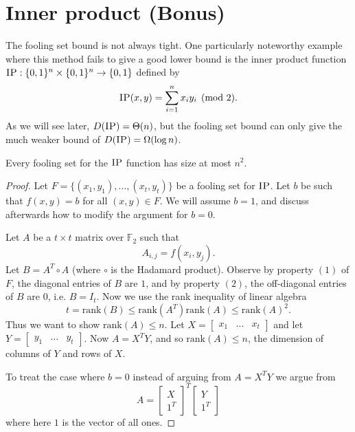 \newpage \section{Inner product (Bonus)}

The fooling set bound is not always tight. One particularly noteworthy example where this method fails to give a good lower bound is the inner product function  $\textsc{IP} : \{0,1\}^n \times \{0,1\}^n \to \{0,1\}$ defined by
\[
\textsc{IP}(x,y) = \sum_{i=1}^n x_i y_i \pmod{2}.
\]
As we will see later, $D(\textsc{IP}) = \Theta(n)$, but the fooling set bound can only give the much weaker bound of $D(\textsc{IP}) = \Omega(\log n)$.

\begin{theorem}
Every fooling set for the $\textsc{IP}$ function has size at most $n^2$.
\end{theorem}

\begin{proof}
Let $F = \{(x_1,y_1),\dots, (x_t,y_t)\}$ be a fooling set for $\textsc{IP}$. Let $b$ be such that $f(x,y) = b$ for all $(x,y) \in F$. We will assume $b=1$, and discuss afterwards how to modify the argument for $b=0$.

Let $A$ be a $t\times t$ matrix over $\mathbb{F}_2$ such that
$$A_{i,j} = f(x_i,y_j).$$
Let $B = A^T\circ A$ (where $\circ$ is the Hadamard product). Observe by property $(1)$ of $F$, the diagonal entries of $B$ are $1$, and by property $(2)$, the off-diagonal entries of $B$ are $0$, i.e. $B = I_t$. Now we use the rank inequality of linear algebra
$$t = \text{rank}(B) \leq \text{rank}(A^T)\text{rank}(A) \leq \text{rank}(A)^2.$$
Thus we want to show $\text{rank}(A) \leq n$. Let $X = \begin{bmatrix}
x_1 & \dots & x_t
\end{bmatrix}$
and let $Y = \begin{bmatrix}
y_1 &\dots & y_t
\end{bmatrix}$. Now $A = X^TY$, and so $\text{rank}(A) \leq n$, the dimension of columns of $Y$ and rows of $X$. 

To treat the case where $b=0$ instead of arguing from $A = X^T Y$ we argue from 
$$A = \begin{bmatrix}
X\\ 1^T
\end{bmatrix}^T\begin{bmatrix}
Y\\ 1^T
\end{bmatrix}$$
where here $1$ is the vector of all ones.
\end{proof}



